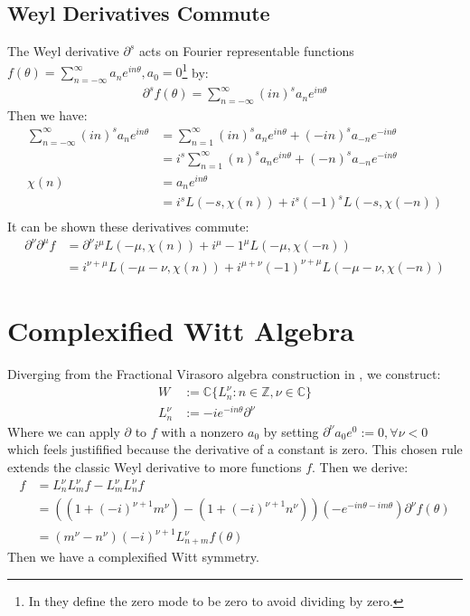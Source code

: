 \documentclass{artjltcopy}
\newcommand{\?}{\textbackslash}
\newcommand{\C}{\mathbb{C}}
\newcommand{\Z}{\mathbb{Z}}
\begin{document}
\subsection{Weyl Derivatives Commute}
The Weyl derivative $\partial^s$ \cite{article} acts on Fourier representable functions 
$f(\theta)= \sum_{n=-\infty}^\infty a_n e^{i n \theta}, a_0 = 0$\footnote{In \cite{article} they define the zero mode to be zero to avoid dividing by zero.} by:
\begin{align*}
  \partial^s f(\theta)= \sum_{n=-\infty}^\infty (in)^s a_n e^{i n \theta}
\end{align*}
Then we have:
\begin{align*}
  \sum_{n=-\infty}^\infty (in)^s a_n e^{i n \theta} &= \sum_{n=1}^\infty (in)^s a_n e^{i n \theta} + (-in)^s a_{-n} e^{-i n \theta} \\
  &= i^s \sum_{n=1}^\infty (n)^s a_n e^{i n \theta} + (-n)^s a_{-n} e^{-i n \theta} \\
  \chi(n) &= a_n e^{i n \theta} \\
  &= i^s L(-s,\chi(n)) + i^s (-1)^s L(-s,\chi(-n)) \\
\end{align*}
It can be shown these derivatives commute:
\begin{align*}
  \partial^\nu \partial^\mu f &= \partial^\nu i^\mu L(-\mu,\chi(n))+ i^\mu -1^\mu L(-\mu,\chi(-n)) \\
  &= i^{\nu + \mu} L(-\mu-\nu,\chi(n)) + i^{\mu + \nu} (-1)^{\nu+\mu} L(-\mu-\nu,\chi(-n))
\end{align*}
\section{Complexified Witt Algebra}
Diverging from the Fractional Virasoro algebra construction in \cite{La_Nave_2019}, we construct:
\begin{align*}
W &:= \C \{L^\nu_n: n \in \Z, \nu \in \C \} \\
L^\nu_n &:= -i e^{-i n \theta} \partial^\nu
\end{align*}
Where we can apply $\partial$ to $f$ with a nonzero $a_0$ by setting $\partial^\nu a_0 e^{0}:= 0, \forall \nu<0$ which feels justifified because the derivative of a constant is zero. This chosen rule extends the classic Weyl derivative to more functions $f$.  
Then we derive:
\begin{align*}
  [L^\nu_n, L^\nu_m] f &= L^\nu_n L^\nu_m f - L^\nu_m L^\nu_n f \\
  &= ((1+(-i)^{\nu+1} m^\nu)-(1+(-i)^{\nu+1} n^\nu))(- e^{-i n \theta - i m \theta}) \partial^{\nu} f(\theta) \\
  &=(m^{\nu} - n^\nu )(-i)^{\nu+1} L^{\nu}_{n+m} f(\theta)
\end{align*}
Then we have a complexified Witt symmetry.
\end{document}
